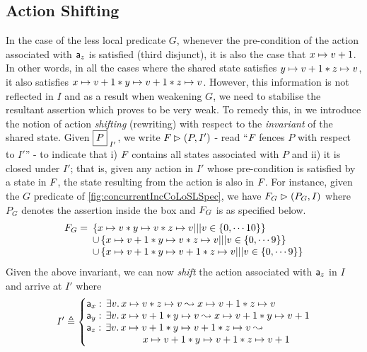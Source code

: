 \subsection{Action Shifting}\label{subsec:shift}
In the case of the less local predicate $G$, whenever the pre-condition of the action associated with $\mathsf{a}_z$ is satisfied (third disjunct), it is also the case that $x \mapsto v+1$. In other words, in all the cases where the shared state satisfies $y \mapsto v+1 * z \mapsto v$, it also satisfies $x \mapsto v+1 * y \mapsto v+1 * z \mapsto v$. However, this information is not reflected in $I$ and as a result when weakening $G$, we need to stabilise the resultant assertion which proves to be very weak. To remedy this, in \colosl we introduce the notion of action \emph{shifting} (rewriting) with respect to the \emph{invariant} of the shared state. Given $\shared{P}{I'}$, we write $F_{} \mathrel{\rhd} (P, I')$ - read ``$F_{}$ fences $P$ with respect to $I'$'' - to indicate that i) $F_{}$ contains all states associated with $P$ and ii) it is closed under $I'$; that is, given any action in $I'$ whose pre-condition is satisfied by a state in $F_{}$, the state resulting from the action is also in $F_{}$. For instance, given the $G$ predicate of \fig\ref{fig:concurrentIncCoLoSLSpec}, we have $F_{G} \mathrel{\rhd} (P_G, I)$ where $P_G$ denotes the assertion inside the box and $F_{G}$ is as specified below.
%
\[
	\begin{array}{l l}
		F_{G} = \hspace*{-5pt}& \left\{x \mapsto v * y \mapsto v * z \mapsto v ||| v \in \{0, \cdots 10\} \right\} \\
		& \cup \left\{x \mapsto v+1 * y \mapsto v * z \mapsto v ||| v \in \{0, \cdots 9 \} \right\} \\
		& \cup \left\{x \mapsto v+1 * y \mapsto v+1 * z \mapsto v ||| v \in \{0, \cdots 9\} \right\}\\
	\end{array}
\]
Given the above invariant, we can now \emph{shift} the action associated with $\mathsf{a}_z$ in $I$ and arrive at $I'$ where
%
\[
	I' \eqdef \left\{
		\begin{array}{@{}l@{}}
			\token a_x:\, \exsts{v} \cell{x}{v} * \cell{z}{v}  \swap  \cell{x}{v+1} * \cell{z}{v}\\
			\token a_y:\, \exsts{v} \cell{x}{v+1} * \cell{y}{v}  \swap  \cell{x}{v+1} * \cell{y}{v+1}\\
			\token a_z:\, \exsts{v} \cell{x}{v+1} *
                        \cell{y}{v+1} * \cell{z}{v} \swap\null\\
			\hspace*{2cm} \cell{x}{v+1} * \cell{y}{v+1} * \cell{z}{v+1}\\
		\end{array}			
	\right.
\]
